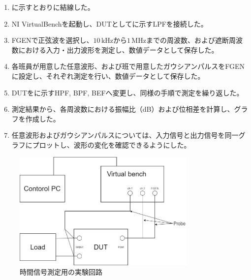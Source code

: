 \documentclass[11pt,dvipdfmx]{jarticle}
\begin{document}
\begin{enumerate}
  \item {}に示すとおりに結線した。
  \item NI VirtualBenchを起動し、DUTとしてに示すLPFを接続した。
  \item FGENで正弦波を選択し、$10\,\mathrm{kHz}$から$1\,\mathrm{MHz}$までの周波数、および遮断周波数における入力・出力波形を測定し、数値データとして保存した。
  \item 各班員が用意した任意波形、および班で用意したガウシアンパルスをFGENに設定し、それぞれ測定を行い、数値データとして保存した。
  \item DUTをに示すHPF, BPF, BEFへ変更し、同様の手順で測定を繰り返した。
  \item 測定結果から、各周波数における振幅比（dB）および位相差を計算し、グラフを作成した。
  \item 任意波形およびガウシアンパルスについては、入力信号と出力信号を同一グラフにプロットし、波形の変化を確認できるようにした。
\end{enumerate}
\begin{figure}[H]
  \centering
  \includegraphics[width=0.8\textwidth]{fig/VirtualBench.drawio.png}
  \caption{時間信号測定用の実験回路}
  \label{fig:実験回路1}  
\end{figure}
\end{document}
